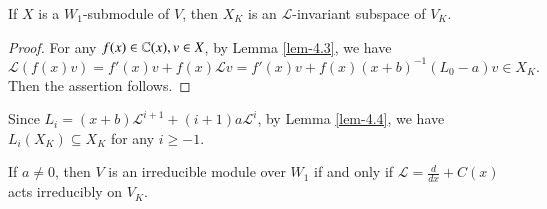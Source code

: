 \documentclass[12pt]{amsart}
\begin{document}
\begin{lem}\label{lem-4.4}
If
$X$ is a $W_1$-submodule of $V$, then $X_K$ is an $\mathcal{L}$-invariant subspace of $V_K$.
\end{lem}
\begin{proof}
For any $f(x)\in \mathbb{C}(x), v\in X$, by Lemma \ref{lem-4.3}, we have
$$\mathcal{L}(f(x)v)=f'(x)v+f(x)\mathcal{L}v=f'(x)v+f(x)(x+b)^{-1}(L_0-a)v\in X_K.$$
Then the assertion follows.
\end{proof}
\begin{rmk}
Since $L_i=(x+b)\mathcal{L}^{i+1}+(i+1)a\mathcal{L}^i$, by Lemma \ref{lem-4.4}, we have $L_i(X_K)\subseteq X_K$ for any $i\geq -1$.
\end{rmk}
\begin{pro}\label{thm-4.1}
If $a\neq 0$,
then $V$ is an irreducible module over $W_1$ if and only if %
$\mathcal{L}=\frac{d}{dx}+C(x)$ acts irreducibly on $V_K$.
\end{pro}
\end{document}
